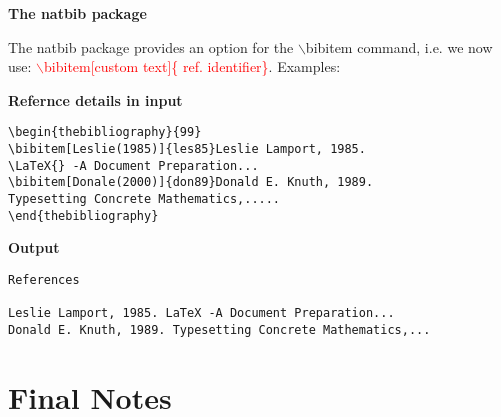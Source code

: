 \begin{frame}[t,fragile]{\textbf{\textbf{The natbib package}}}



The natbib package provides an option for the $\backslash$bibitem command, i.e. we now use: \textcolor{red}{$\backslash$bibitem[custom text]\{ ref. identifier\}}. Examples:
\scriptsize
\begin{varblock}[10cm]{\textbf{Refernce details in input}}
\vspace{-0.3cm}
\begin{verbatim}
\begin{thebibliography}{99}
\bibitem[Leslie(1985)]{les85}Leslie Lamport, 1985. 
\LaTeX{} -A Document Preparation...
\bibitem[Donale(2000)]{don89}Donald E. Knuth, 1989. 
Typesetting Concrete Mathematics,.....
\end{thebibliography} 
\end{verbatim}
\vspace{-0.3cm}
\end{varblock}

\begin{varblock}[10cm]{\textbf{Output}}
\vspace{-0.3cm}
\begin{verbatim}
References

Leslie Lamport, 1985. LaTeX -A Document Preparation...
Donald E. Knuth, 1989. Typesetting Concrete Mathematics,...
\end{verbatim}
\vspace{-0.3cm}
\end{varblock}

\end{frame}

\section{Final Notes}

